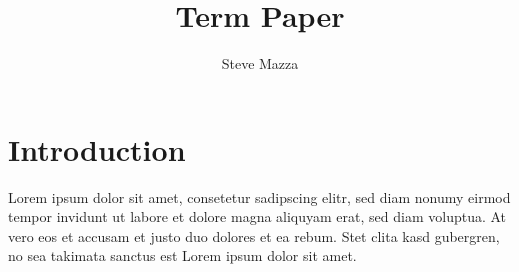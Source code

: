 \documentclass[jou,apacite]{apa6}
\title{Term Paper}
\author{Steve Mazza}
\affiliation{Naval Postgraduate School}
\begin{document}
\maketitle    
                        
\section{Introduction}
Lorem ipsum dolor sit amet, consetetur sadipscing elitr, sed diam nonumy eirmod
tempor invidunt ut labore et dolore magna aliquyam erat, sed diam voluptua. At
vero eos et accusam et justo duo dolores et ea rebum. Stet clita kasd gubergren,
no sea takimata sanctus est Lorem ipsum dolor sit amet.~\cite[page 112]{Axelrod}


\end{document}
